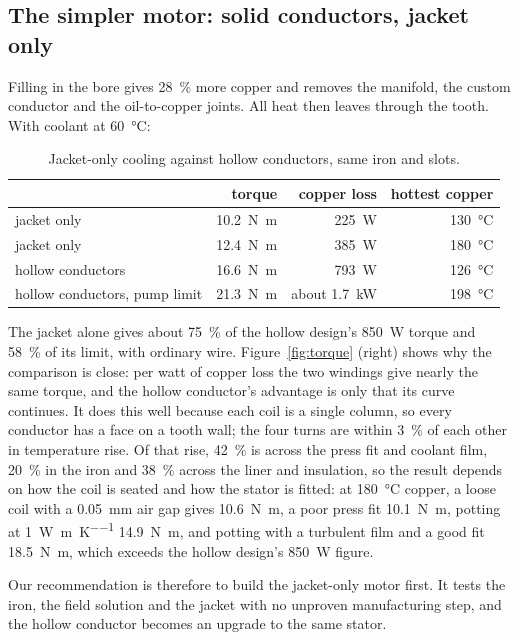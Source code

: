 \documentclass[11pt]{article}
\newcommand{\Nm}{\si{N.m}}
\begin{document}
\subsection{The simpler motor: solid conductors, jacket only}
\label{sec:jacket}

Filling in the bore gives \SI{28}{\percent} more copper and removes the
manifold, the custom conductor and the oil-to-copper joints. All heat then
leaves through the tooth. With coolant at \SI{60}{\celsius}:

\begin{table}[h]
\centering
\begin{tabular}{lrrr}
\toprule
 & torque & copper loss & hottest copper\\
\midrule
jacket only & \SI{10.2}{\Nm} & \SI{225}{W} & \SI{130}{\celsius}\\
jacket only & \SI{12.4}{\Nm} & \SI{385}{W} & \SI{180}{\celsius}\\
hollow conductors & \SI{16.6}{\Nm} & \SI{793}{W} & \SI{126}{\celsius}\\
hollow conductors, pump limit & \SI{21.3}{\Nm} & about \SI{1.7}{kW} & \SI{198}{\celsius}\\
\bottomrule
\end{tabular}
\caption{Jacket-only cooling against hollow conductors, same iron and slots.}
\label{tab:jacket}
\end{table}

The jacket alone gives about \SI{75}{\percent} of the hollow design's
\SI{850}{W} torque and \SI{58}{\percent} of its limit, with ordinary wire.
Figure~\ref{fig:torque} (right) shows why the comparison is close: per watt of
copper loss the two windings give nearly the same torque, and the hollow
conductor's advantage is only that its curve continues. It does this well
because each coil is a single column, so every conductor has a face on a tooth
wall; the four turns are within \SI{3}{\percent} of each other in temperature
rise. Of that rise, \SI{42}{\percent} is across the press fit and coolant
film, \SI{20}{\percent} in the iron and \SI{38}{\percent} across the liner and
insulation, so the result depends on how the coil is seated and how the stator
is fitted: at \SI{180}{\celsius} copper, a loose coil with a \SI{0.05}{mm}
air gap gives \SI{10.6}{\Nm}, a poor press fit \SI{10.1}{\Nm}, potting at
\SI{1}{W\per\metre\per\kelvin} \SI{14.9}{\Nm}, and potting with a
turbulent film and a good fit \SI{18.5}{\Nm}, which exceeds the hollow
design's \SI{850}{W} figure.

Our recommendation is therefore to build the jacket-only motor first. It tests
the iron, the field solution and the jacket with no unproven manufacturing
step, and the hollow conductor becomes an upgrade to the same stator.
\end{document}
